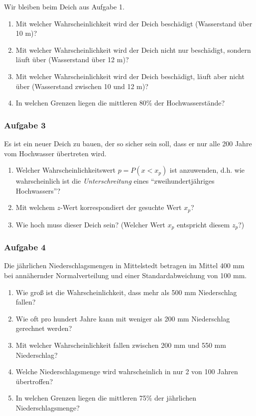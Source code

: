 \documentclass[
  ngerman,
]{article}
\providecommand{\tightlist}{%
  \setlength{\itemsep}{0pt}\setlength{\parskip}{0pt}}
\begin{document}
Wir bleiben beim Deich aus Aufgabe 1.

\begin{enumerate}
\def\labelenumi{\alph{enumi})}
\tightlist
\item
  Mit welcher Wahrscheinlichkeit wird der Deich beschädigt (Wasserstand über 10 m)?
\item
  Mit welcher Wahrscheinlichkeit wird der Deich nicht nur beschädigt, sondern läuft über (Wasserstand über 12 m)?
\item
  Mit welcher Wahrscheinlichkeit wird der Deich beschädigt, läuft aber nicht über (Wasserstand zwischen 10 und 12 m)?
\item
  In welchen Grenzen liegen die mittleren 80\% der Hochwasserstände?
\end{enumerate}

\hypertarget{aufgabe-3}{%
\subsubsection{Aufgabe 3}\label{aufgabe-3}}

Es ist ein neuer Deich zu bauen, der so sicher sein soll, dass er nur alle 200 Jahre vom Hochwasser übertreten wird.

\begin{enumerate}
\def\labelenumi{\alph{enumi})}
\tightlist
\item
  Welcher Wahrscheinlichkeitswert \(p=P(x < x_p)\) ist anzuwenden, d.h. wie wahrscheinlich ist die \emph{Unterschreitung} eines ``zweihundertjähriges Hochwassers''?
\item
  Mit welchem \(z\)-Wert korrespondiert der gesuchte Wert \(x_p\)?
\item
  Wie hoch muss dieser Deich sein? (Welcher Wert \(x_p\) entspricht diesem \(z_p\)?)
\end{enumerate}

\hypertarget{aufgabe-4}{%
\subsubsection{Aufgabe 4}\label{aufgabe-4}}

Die jährlichen Niederschlagsmengen in Mittelstedt betragen im Mittel 400 mm bei annähernder Normalverteilung und einer Standardabweichung von 100 mm.

\begin{enumerate}
\def\labelenumi{\alph{enumi})}
\tightlist
\item
  Wie groß ist die Wahrscheinlichkeit, dass mehr als 500 mm Niederschlag fallen?
\item
  Wie oft pro hundert Jahre kann mit weniger als 200 mm Niederschlag gerechnet werden?
\item
  Mit welcher Wahrscheinlichkeit fallen zwischen 200 mm und 550 mm Niederschlag?
\item
  Welche Niederschlagsmenge wird wahrscheinlich in nur 2 von 100 Jahren übertroffen?
\item
  In welchen Grenzen liegen die mittleren 75\% der jährlichen Niederschlagsmenge?
\end{enumerate}
\end{document}
